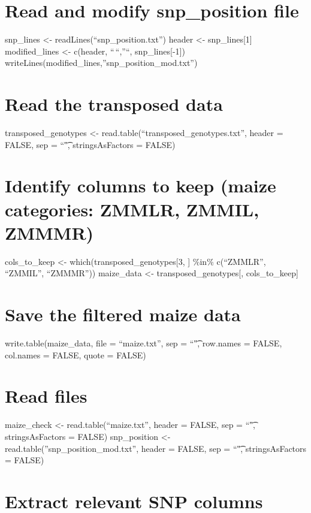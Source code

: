 \documentclass[
]{article}
\begin{document}
\section{Read and modify snp\_position
file}\label{read-and-modify-snp_position-file}

snp\_lines \textless- readLines(``snp\_position.txt'') header \textless-
snp\_lines{[}1{]} modified\_lines \textless- c(header, ``\,``,''``,
snp\_lines{[}-1{]})
writeLines(modified\_lines,''snp\_position\_mod.txt'')

\section{Read the transposed data}\label{read-the-transposed-data}

transposed\_genotypes \textless-
read.table(``transposed\_genotypes.txt'', header = FALSE, sep = ``\t",
stringsAsFactors = FALSE)

\section{Identify columns to keep (maize categories: ZMMLR, ZMMIL,
ZMMMR)}\label{identify-columns-to-keep-maize-categories-zmmlr-zmmil-zmmmr}

cols\_to\_keep \textless- which(transposed\_genotypes{[}3, {]} \%in\%
c(``ZMMLR'', ``ZMMIL'', ``ZMMMR'')) maize\_data \textless-
transposed\_genotypes{[}, cols\_to\_keep{]}

\section{Save the filtered maize
data}\label{save-the-filtered-maize-data}

write.table(maize\_data, file = ``maize.txt'', sep = ``\t", row.names =
FALSE, col.names = FALSE, quote = FALSE)

\section{Read files}\label{read-files}

maize\_check \textless- read.table(``maize.txt'', header = FALSE, sep =
``\t", stringsAsFactors = FALSE) snp\_position \textless-
read.table(''snp\_position\_mod.txt'', header = FALSE, sep = ``\t",
stringsAsFactors = FALSE)

\section{Extract relevant SNP
columns}\label{extract-relevant-snp-columns}
\end{document}
